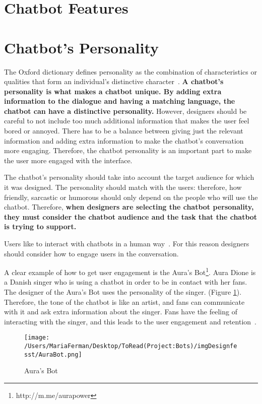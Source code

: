 \documentclass[a4paper,10pt]{article}
\begin{document}
\section*{Chatbot Features}

\section{Chatbot's Personality}

The Oxford dictionary defines personality as the combination of characteristics or qualities that form an individual's distinctive character~\cite{Oxford}. \textbf{A chatbot’s personality is what makes a chatbot unique. By adding extra information to the dialogue and having a matching language, the chatbot can have a distinctive personality.} However, designers should be careful to not include too much additional information that makes the user feel bored or annoyed. There has to be a balance between giving just the relevant information and adding extra information to make the chatbot's conversation more engaging. Therefore, the chatbot personality is an important part to make the user more engaged with the interface.

The chatbot’s personality should take into account the target audience for which it was designed. The personality should match with the users: therefore, how friendly, sarcastic or humorous should only depend on the people who will use the chatbot. Therefore, \textbf{when designers are selecting the chatbot personality, they must consider the chatbot audience and the task that the chatbot is trying to support.}  

Users like to interact with chatbots in a human way~\cite{HeuristicsWebPage}. For this reason designers should consider how to engage users in the conversation. 

A clear example of how to get user engagement is the Aura's Bot\footnote{http://m.me/aurapower}. Aura Dione is a Danish singer who is using a chatbot in order to be in contact with her fans. The designer of the Aura's Bot uses the personality of the singer. (Figure \ref{FigureAura}). Therefore, the tone of the chatbot is like an artist, and fans can communicate with it and ask extra information about the singer. Fans have the feeling of interacting with the singer, and this leads to the user engagement and retention~\cite{personality}.  

\begin{figure}
\centering
\texttt{[image: /Users/MariaFerman/Desktop/ToRead(Project:Bots)/imgDesignfesst/AuraBot.png]}
\caption{Aura's Bot}
\label{FigureAura}
\end{figure}
\end{document}
